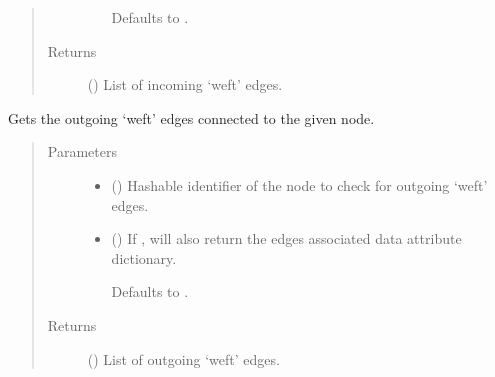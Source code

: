 \documentclass[letterpaper,10pt,english]{sphinxmanual}
\begin{document}
\begin{fulllineitems}
\begin{fulllineitems}
\begin{quote}
\begin{description}
\begin{itemize}
Defaults to .


\end{itemize}

\item[{Returns}] \leavevmode
{} () \textendash{} List of incoming ‘weft’ edges.

\end{description}\end{quote}

\end{fulllineitems}


\begin{fulllineitems}
\label{\detokenize{cockatoo:cockatoo.KnitDiNetwork.node_weft_edges_out}}
Gets the outgoing ‘weft’ edges connected to the given node.
\begin{quote}\begin{description}
\item[{Parameters}] \leavevmode\begin{itemize}
\item {} 
 () \textendash{} Hashable identifier of the node to check for outgoing ‘weft’ edges.

\item {} 
 (\sphinxstyleliteralemphasis{\sphinxupquote{, }}) \textendash{} 
If , will also return the edges associated data attribute
dictionary.

Defaults to .


\end{itemize}

\item[{Returns}] \leavevmode
{} () \textendash{} List of outgoing ‘weft’ edges.


\end{description}
\end{quote}
\end{fulllineitems}
\end{fulllineitems}
\end{document}
